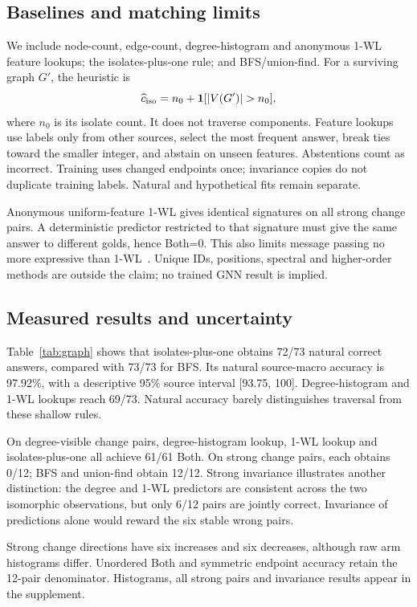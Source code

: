 \documentclass[10pt,twocolumn,letterpaper]{article}
\begin{document}
\subsection{Baselines and matching limits}
We include node-count, edge-count, degree-histogram and anonymous
1-WL feature lookups; the isolates-plus-one rule; and BFS/union-find.
For a surviving graph $G'$, the heuristic is
\begin{equation}
\widehat c_{\rm iso}=n_0+\mathbf{1}[|V(G')|>n_0],
\end{equation}
where $n_0$ is its isolate count. It does not traverse components.
Feature lookups use labels only from other sources, select the most
frequent answer, break ties toward the smaller integer, and abstain
on unseen features. Abstentions count as incorrect. Training uses
changed endpoints once; invariance copies do not duplicate training
labels. Natural and hypothetical fits remain separate.

Anonymous uniform-feature 1-WL gives identical signatures on all strong
change pairs. A deterministic predictor restricted to that signature
must give the same answer to different golds, hence Both=0.
This also limits message passing no more expressive than
1-WL~\cite{xu2019gnn}. Unique IDs, positions, spectral and higher-order
methods are outside the claim; no trained GNN result is implied.

\subsection{Measured results and uncertainty}
Table~\ref{tab:graph} shows that isolates-plus-one obtains 72/73 natural
correct answers, compared with 73/73 for BFS. Its natural source-macro
accuracy is 97.92\%, with a descriptive 95\% source interval
[93.75, 100]. Degree-histogram and 1-WL lookups reach 69/73.
Natural accuracy barely distinguishes traversal from these shallow rules.

On degree-visible change pairs, degree-histogram lookup, 1-WL lookup
and isolates-plus-one all achieve 61/61 Both. On strong change pairs,
each obtains 0/12; BFS and union-find obtain 12/12.
Strong invariance illustrates another distinction: the degree and
1-WL predictors are consistent across the two isomorphic observations,
but only 6/12 pairs are jointly correct. Invariance of predictions
alone would reward the six stable wrong pairs.

Strong change directions have six increases and six decreases, although
raw arm histograms differ. Unordered Both and symmetric endpoint
accuracy retain the 12-pair denominator. Histograms, all strong pairs
and invariance results appear in the supplement.
\end{document}
